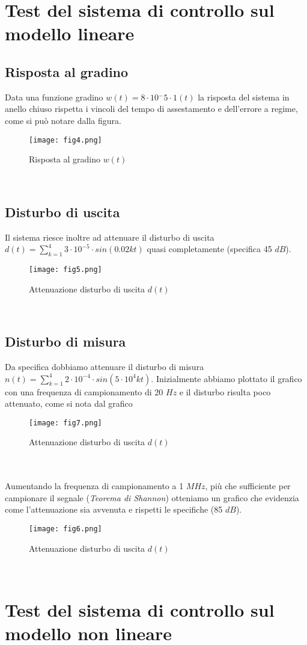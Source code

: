 \documentclass{article}
\begin{document}
\section{Test del sistema di controllo sul modello lineare}

\subsection{Risposta al gradino}
Data una funzione gradino $w(t)=8\cdot10{^-5}\cdot1(t)$ la risposta del sistema in anello chiuso rispetta i vincoli del tempo di assestamento e dell'errore a regime, come si può notare dalla figura.
\begin{figure}[!h]
\centering
\texttt{[image: fig4.png]}
\caption{\label{fig:orbit}Risposta al gradino $w(t)$}
\end{figure}\\

\subsection{Disturbo di uscita}
Il sistema riesce inoltre ad attenuare il disturbo di uscita $d(t)=\sum_{k=1}^4 3\cdot10^{-5}\cdot sin(0.02kt)$ quasi completamente (specifica 45 $dB$).
\begin{figure}[!h]
\centering
\texttt{[image: fig5.png]}
\caption{\label{fig:orbit}Attenuazione disturbo di uscita $d(t)$}
\end{figure}\\

\subsection{Disturbo di misura}
Da specifica dobbiamo attenuare il disturbo di misura $n(t)=\sum_{k=1}^4 2\cdot10^{-4}\cdot sin(5\cdot 10^4kt)$. Inizialmente abbiamo plottato il grafico con una frequenza di campionamento di 20 $Hz$ e il disturbo risulta poco attenuato, come si nota dal grafico
\begin{figure}[!h]
\centering
\texttt{[image: fig7.png]}
\caption{\label{fig:orbit}Attenuazione disturbo di uscita $d(t)$}
\end{figure}\\ \\
Aumentando la frequenza di campionamento a 1 $MHz$, più che sufficiente per campionare il segnale 
(\textit{Teorema di Shannon}) otteniamo un grafico che evidenzia come l'attenuazione sia avvenuta e rispetti le specifiche (85 $dB$).
\begin{figure}[!h]
\centering
\texttt{[image: fig6.png]}
\caption{\label{fig:orbit}Attenuazione disturbo di uscita $d(t)$}
\end{figure}\\


\section{Test del sistema di controllo sul modello non lineare}
\end{document}
